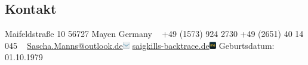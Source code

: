 \documentclass[a4paper]{friggeri-cv} %
\begin{document}


\begin{aside} %
\section{Kontakt}
Maifeldstraße 10
56727 Mayen
Germany
~
+49 (1573) 924 2730
+49 (2651) 40 14 045
~
\href{mailto:Sascha.Manns@outlook.de}{Sascha.Manns@outlook.de}\includegraphics[width=0.3cm]{../Pictures/email.png}
\href{https://saigkills-backtrace.de}{saigkills-backtrace.de}\includegraphics[width=0.3cm]{../Pictures/aboutme.png}
Geburtsdatum: 01.10.1979

\end{aside}
\end{document}
